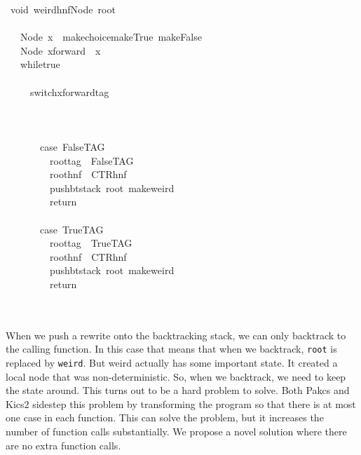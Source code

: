 \documentclass{book}
\theoremstyle{definition}
\begin{document}
{\begin{tabbing}\ttfamily
~void~weirdhnfNode~root\\
\ttfamily ~\\
\ttfamily ~~~Node~x~~makechoicemakeTrue~makeFalse\\
\ttfamily ~~~Node~xforward~~x\\
\ttfamily ~~~whiletrue\\
\ttfamily ~~~\\
\ttfamily ~~~~~switchxforwardtag\\
\ttfamily ~~~~~\\
\ttfamily ~~~~~~~\\
\ttfamily ~\\
\ttfamily ~~~~~~~case~FalseTAG\\
\ttfamily ~~~~~~~~~roottag~~FalseTAG\\
\ttfamily ~~~~~~~~~roothnf~~CTRhnf\\
\ttfamily ~~~~~~~~~pushbtstack~root~makeweird\\
\ttfamily ~~~~~~~~~return\\
\ttfamily ~\\
\ttfamily ~~~~~~~case~TrueTAG\\
\ttfamily ~~~~~~~~~roottag~~TrueTAG\\
\ttfamily ~~~~~~~~~roothnf~~CTRhnf\\
\ttfamily ~~~~~~~~~pushbtstack~root~makeweird\\
\ttfamily ~~~~~~~~~return\\
\ttfamily ~~~~~\\
\ttfamily ~
\end{tabbing}

When we push a rewrite onto the backtracking stack,
we can only backtrack to the calling function.
In this case that means that when we backtrack, \texttt{root} is replaced by \texttt{weird}.
But weird actually has some important state.
It created a local node that was non-deterministic.
So, when we backtrack, we need to keep the state around.
This turns out to be a hard problem to solve.
Both Pakcs and Kics2 sidestep this problem by transforming the program
so that there is at most one case in each function. \cite{kics2, pakcs}
This can solve the problem, but it increases the number of function calls substantially.
We propose a novel solution where there are no extra function calls.

}
\end{document}
